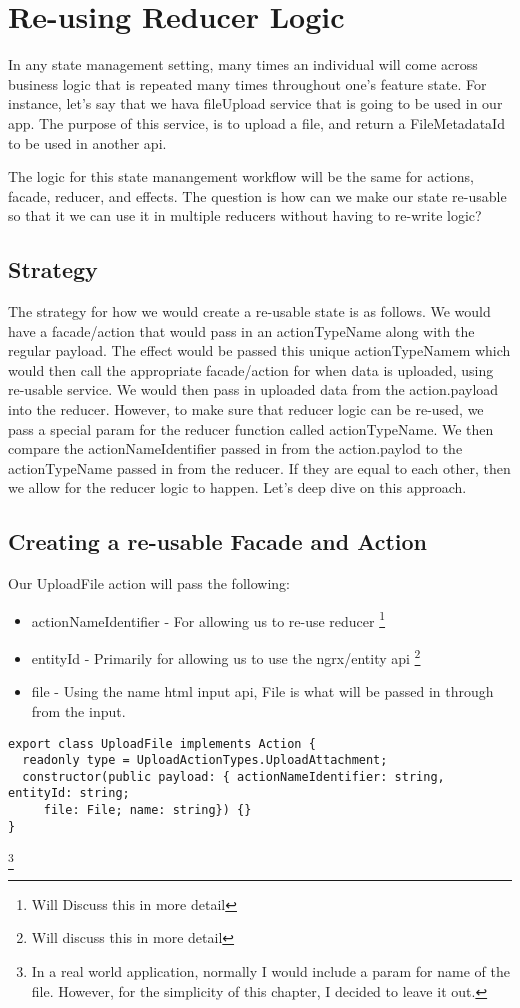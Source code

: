 
\section{ Re-using Reducer Logic }

In any state management setting, many times an individual will come across
business logic that is repeated many times throughout one's feature state. For
instance, let's say that we hava fileUpload service that is going to be used in
our app. The purpose of this service, is to upload a file, and return a
FileMetadataId to be used in another api.

The logic for this state manangement workflow will be the same for actions,
facade, reducer, and effects. The question is how can we make our state
re-usable so that it we can use it in multiple reducers without having to
re-write logic?

\subsection{ Strategy }

The strategy for how we would create a re-usable state is as follows. We would
have a facade/action that would pass in an actionTypeName along with the
regular payload. The effect would be passed this unique actionTypeNamem which
would then call the appropriate facade/action for when data is uploaded, using
re-usable service. We would then pass in uploaded data from the action.payload
into the reducer. However, to make sure that reducer logic can be re-used, we
pass a special param for the reducer function called actionTypeName. We then
compare the actionNameIdentifier passed in from the action.paylod to the
actionTypeName passed in from the reducer. If they are equal to each other, then
we allow for the reducer logic to happen. Let's deep dive on this approach.

\subsection{Creating a re-usable Facade and Action}
Our UploadFile action will pass the following:
\begin{itemize}
  \item actionNameIdentifier - For allowing us to re-use reducer
  \footnote{Will Discuss this in more detail}
  \item entityId - Primarily for allowing us to use the ngrx/entity api
  \footnote{Will discuss this in more detail}
  \item file - Using the name html input api, File is what will be passed in
  through from the input.
\end{itemize}
\begin{lstlisting}
export class UploadFile implements Action {
  readonly type = UploadActionTypes.UploadAttachment;
  constructor(public payload: { actionNameIdentifier: string, entityId: string;
     file: File; name: string}) {}
}
\end{lstlisting}
\footnote{In a real world application, normally I would include a param for name
of the file. However, for the simplicity of this chapter, I decided to leave
it out.}

